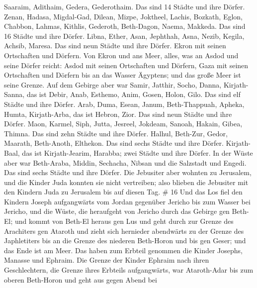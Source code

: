  Saaraim, Adithaim, Gedera, Gederothaim. Das sind 14 Städte
und ihre Dörfer.  Zenan, Hadasa, Migdal-Gad, 
Dilean, Mizpe, Joktheel,  Lachis, Bozkath, Eglon,
 Chabbon, Lahmas, Kithlis,  Gederoth,
Beth-Dagon, Naema, Makkeda. Das sind 16 Städte und ihre Dörfer.
 Libna, Ether, Asan,  Jephthah, Asna, Nezib,
 Kegila, Achsib, Maresa. Das sind neun Städte und ihre
Dörfer.  Ekron mit seinen Ortschaften und Dörfern.
 Von Ekron und ans Meer, alles, was an Asdod und seine
Dörfer reicht:  Asdod mit seinen Ortschaften und Dörfern,
Gaza mit seinen Ortschaften und Dörfern bis an das Wasser Ägyptens; und
das große Meer ist seine Grenze.  Auf dem Gebirge aber war
Samir, Jatthir, Socho,  Danna, Kirjath-Sanna, das ist
Debir,  Anab, Esthemo, Anim,  Gosen, Holon,
Gilo. Das sind elf Städte und ihre Dörfer.  Arab, Duma,
Esean,  Janum, Beth-Thappuah, Apheka,  Humta,
Kirjath-Arba, das ist Hebron, Zior. Das sind neun Städte und ihre
Dörfer.  Maon, Karmel, Siph, Jutta,  Jesreel,
Jokdeam, Sanoah,  Hakain, Gibea, Thimna. Das sind zehn
Städte und ihre Dörfer.  Halhul, Beth-Zur, Gedor,
 Maarath, Beth-Anoth, Elthekon. Das sind sechs Städte und
ihre Dörfer.  Kirjath-Baal, das ist Kirjath-Jearim,
Harabba; zwei Städte und ihre Dörfer.  In der Wüste aber
war Beth-Araba, Middin, Sechacha,  Nibsan und die Salzstadt
und Engedi. Das sind sechs Städte und ihre Dörfer.  Die
Jebusiter aber wohnten zu Jerusalem, und die Kinder Juda konnten sie
nicht vertreiben; also blieben die Jebusiter mit den Kindern Juda zu
Jerusalem bis auf diesen Tag. \# 16  Und das Los fiel den
Kindern Joseph aufgangwärts vom Jordan gegenüber Jericho bis zum Wasser
bei Jericho, und die Wüste, die heraufgeht von Jericho durch das Gebirge
gen Beth-El;  und kommt von Beth-El heraus gen Lus und geht
durch zur Grenze des Arachiters gen Ataroth  und zieht sich
hernieder abendwärts zu der Grenze des Japhletiters bis an die Grenze
des niederen Beth-Horon und bis gen Geser; und das Ende ist am Meer.
 Das haben zum Erbteil genommen die Kinder Josephs, Manasse
und Ephraim.  Die Grenze der Kinder Ephraim nach ihren
Geschlechtern, die Grenze ihres Erbteils aufgangwärts, war Ataroth-Adar
bis zum oberen Beth-Horon  und geht aus gegen Abend bei
